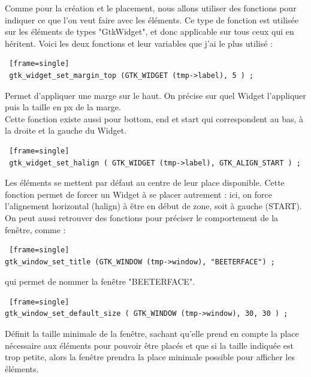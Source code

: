 \documentclass[11pt,french,a4paper]{report}
\begin{document}
Comme pour la création et le placement, nous allons utiliser des fonctions pour indiquer ce que l'on veut faire avec les éléments.
Ce type de fonction est utilisée sur les éléments de types "GtkWidget", et donc applicable sur tous ceux qui en héritent. Voici les
deux fonctions et leur variables que j'ai le plus utilisé : \\


\begin{lstlisting} [frame=single]
 gtk_widget_set_margin_top (GTK_WIDGET (tmp->label), 5 ) ; 
\end{lstlisting}

Permet d'appliquer une marge sur le haut. On précise sur quel Widget l'appliquer puis la taille en px de la marge.\\
Cette fonction existe aussi pour bottom, end et start qui correspondent au bas, à la droite et la gauche du Widget.\\

\begin{lstlisting} [frame=single]
 gtk_widget_set_halign ( GTK_WIDGET (tmp->label), GTK_ALIGN_START ) ;
\end{lstlisting}
Les éléments se mettent par défaut au centre de leur place disponible. Cette fonction permet 
de forcer un Widget à se placer autrement : ici, on force l'alignement horizontal (halign) à être en début de zone, 
soit à gauche (START). \\


On peut aussi retrouver des fonctions pour préciser le comportement de la fenêtre, comme : \\
 
\begin{lstlisting} [frame=single]
gtk_window_set_title (GTK_WINDOW (tmp->window), "BEETERFACE") ; 
\end{lstlisting}
qui permet de nommer la fenêtre "BEETERFACE". \\

\begin{lstlisting} [frame=single]
gtk_window_set_default_size ( GTK_WINDOW (tmp->window), 30, 30 ) ; 
\end{lstlisting}
Définit la taille minimale de la fenêtre, sachant qu'elle prend en compte la place nécessaire aux éléments pour pouvoir 
être placés et que si la taille indiquée est trop petite, alors la fenêtre prendra la place minimale possible 
pour afficher les éléments. \\
\end{document}
